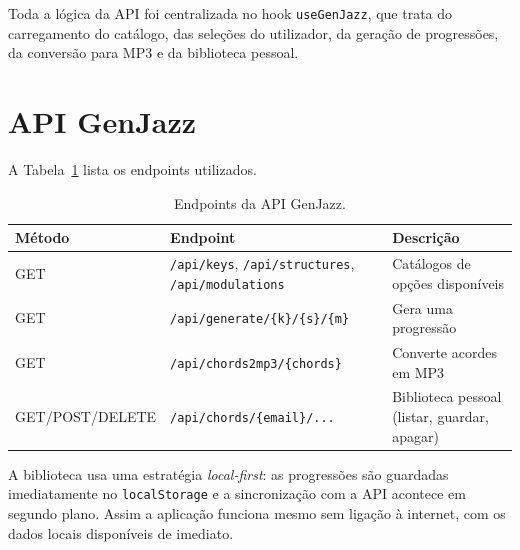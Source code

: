 Toda a lógica da API foi centralizada no hook \texttt{useGenJazz}, que trata do carregamento do catálogo, das seleções do utilizador, da geração de progressões, da conversão para MP3 e da biblioteca pessoal.

\section{API GenJazz}
\label{chap2:sec:api}

A Tabela~\ref{tab:api-endpoints} lista os endpoints utilizados.

\begin{table}[!htb]
\centering\small
\begin{tabular}{llp{5.5cm}}
\toprule
\textbf{Método} & \textbf{Endpoint} & \textbf{Descrição} \\
\midrule
GET & \texttt{/api/keys}, \texttt{/api/structures}, \texttt{/api/modulations} & Catálogos de opções disponíveis \\
GET & \texttt{/api/generate/\{k\}/\{s\}/\{m\}} & Gera uma progressão \\
GET & \texttt{/api/chords2mp3/\{chords\}} & Converte acordes em MP3 \\
GET/POST/DELETE & \texttt{/api/chords/\{email\}/...} & Biblioteca pessoal (listar, guardar, apagar) \\
\bottomrule
\end{tabular}
\caption{Endpoints da API GenJazz.}
\label{tab:api-endpoints}
\end{table}

A biblioteca usa uma estratégia \textit{local-first}: as progressões são guardadas imediatamente no \texttt{localStorage} e a sincronização com a API acontece em segundo plano. Assim a aplicação funciona mesmo sem ligação à internet, com os dados locais disponíveis de imediato.
